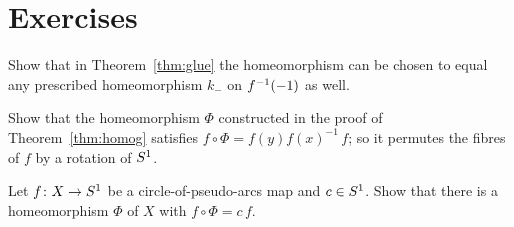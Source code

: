 
\section*{Exercises}

\begin{exercise}
Show that in Theorem~\ref{thm:glue} the homeomorphism can be chosen to equal any prescribed homeomorphism $k_-$ on $f^{-1}(-1)$ as well.
\end{exercise}

\begin{exercise}
Show that the homeomorphism $\Phi$ constructed in the proof of Theorem~\ref{thm:homog} satisfies $f\circ\Phi=f(y)f(x)^{-1}\,f$; so it permutes the
fibres of $f$ by a rotation of $S^1$.
\end{exercise}

\begin{exercise}
Let $f\colon X\to S^1$ be a circle-of-pseudo-arcs map and $c\in S^1$. Show that there is a homeomorphism $\Phi$ of $X$ with $f\circ\Phi=c\,f$.
\end{exercise}
